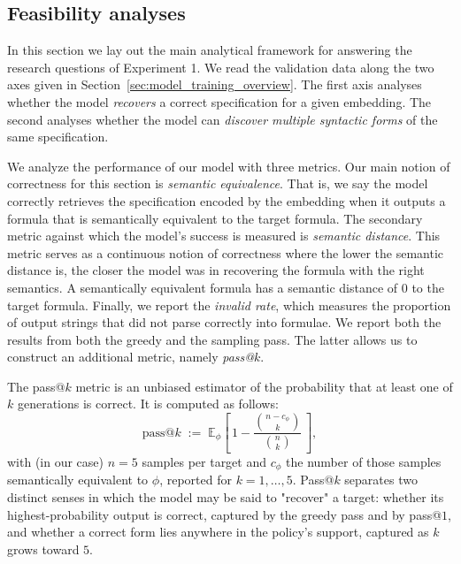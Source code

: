 \documentclass[titlepage,a4paper,11pt]{report}
\begin{document}
    
    \subsection{Feasibility analyses}\label{sec:exp1_analyses}
    In this section we lay out the main analytical framework for answering the research questions of Experiment 1. We read the validation data along the two axes given in Section~\ref{sec:model_training_overview}. The first axis analyses whether the model \emph{recovers} a correct specification for a given embedding. The second analyses whether the model can \emph{discover multiple syntactic forms} of the same specification. 
    
    We analyze the performance of our model with three metrics. Our main notion of correctness for this section is \textit{semantic equivalence}. That is, we say the model correctly retrieves the specification encoded by the embedding when it outputs a formula that is semantically equivalent to the target formula. The secondary metric against which the model's success is measured is \textit{semantic distance}. This metric serves as a continuous notion of correctness where the lower the semantic distance is, the closer the model was in recovering the formula with the right semantics. A semantically equivalent formula has a semantic distance of 0 to the target formula. Finally, we report the \textit{invalid rate}, which measures the proportion of output strings that did not parse correctly into formulae.  We report both the results from both the greedy and the sampling pass. The latter allows us to construct an additional metric, namely \textit{pass@$k$}.

    The pass@$k$ metric is an unbiased estimator \citep{chen_evaluating_2021} of the probability that at least one of $k$ generations is correct. It is computed as follows:
    \begin{equation}\label{eq:pass_at_k}
        \mathrm{pass@}k \;:=\; \mathbb{E}_{\phi}\!\left[\, 1 - \frac{\binom{n - c_\phi}{k}}{\binom{n}{k}} \,\right],
    \end{equation}
    with (in our case) $n = 5$ samples per target and $c_\phi$ the number of those samples semantically equivalent to $\phi$, reported for $k = 1, \dots, 5$. Pass@$k$ separates two distinct senses in which the model may be said to "recover" a target: whether its highest-probability output is correct, captured by the greedy pass and by pass@$1$, and whether a correct form lies anywhere in the policy's support, captured as $k$ grows toward $5$.
\end{document}
